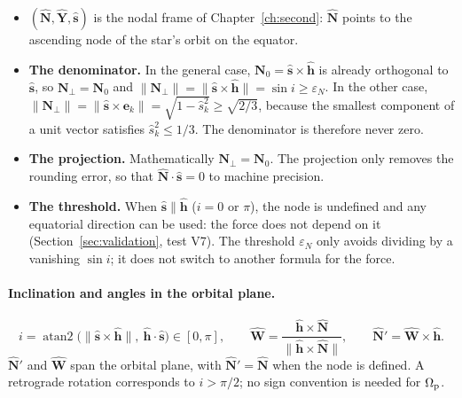 \begin{itemize}
  \item $(\hat{\mathbf N},\hat{\mathbf Y},\hat{\mathbf s})$ is the nodal frame of Chapter~\ref{ch:second}: $\hat{\mathbf N}$ points to the ascending node of the star's orbit on the equator.
  \item \textbf{The denominator.} In the general case, $\mathbf N_0=\hat{\mathbf s}\times\hat{\mathbf h}$ is already orthogonal to $\hat{\mathbf s}$, so $\mathbf N_\perp=\mathbf N_0$ and $\|\mathbf N_\perp\|=\|\hat{\mathbf s}\times\hat{\mathbf h}\|=\sin i\ge\varepsilon_N$. In the other case, $\|\mathbf N_\perp\|=\|\hat{\mathbf s}\times\mathbf e_k\|=\sqrt{1-\hat s_k^2}\ge\sqrt{2/3}$, because the smallest component of a unit vector satisfies $\hat s_k^2\le1/3$. The denominator is therefore never zero.
  \item \textbf{The projection.} Mathematically $\mathbf N_\perp=\mathbf N_0$. The projection only removes the rounding error, so that $\hat{\mathbf N}\cdot\hat{\mathbf s}=0$ to machine precision.
  \item \textbf{The threshold.} When $\hat{\mathbf s}\parallel\hat{\mathbf h}$ ($i=0$ or $\pi$), the node is undefined and any equatorial direction can be used: the force does not depend on it (Section~\ref{sec:validation}, test V7). The threshold $\varepsilon_N$ only avoids dividing by a vanishing $\sin i$; it does not switch to another formula for the force.
\end{itemize}

\paragraph{Inclination and angles in the orbital plane.}
\begin{equation}
  i=\operatorname{atan2}\big(\|\hat{\mathbf s}\times\hat{\mathbf h}\|,\ \hat{\mathbf h}\cdot\hat{\mathbf s}\big)\in[0,\pi],\qquad
  \hat{\mathbf W}=\frac{\hat{\mathbf h}\times\hat{\mathbf N}}{\|\hat{\mathbf h}\times\hat{\mathbf N}\|},\qquad
  \hat{\mathbf N}'=\hat{\mathbf W}\times\hat{\mathbf h}. \label{eq:inclination}
\end{equation}
$\hat{\mathbf N}'$ and $\hat{\mathbf W}$ span the orbital plane, with $\hat{\mathbf N}'=\hat{\mathbf N}$ when the node is defined. A retrograde rotation corresponds to $i>\pi/2$; no sign convention is needed for $\Omega_{\mathrm p}$.

